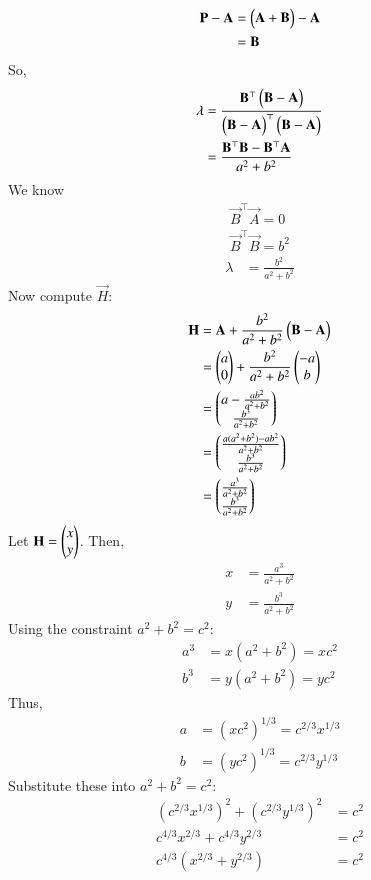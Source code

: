 \documentclass[journal]{IEEEtran}
\begin{document}
\begin{align}
\mathbf{P}-\mathbf{A} &= \begin{pmatrix}\mathbf{A}+\mathbf{B}\end{pmatrix}-\mathbf{A} \\
&= \mathbf{B}
\end{align}
So,
\begin{align}
\lambda &= \frac{\mathbf{B}^\top\begin{pmatrix}\mathbf{B}-\mathbf{A}\end{pmatrix}}{\begin{pmatrix}\mathbf{B}-\mathbf{A}\end{pmatrix}^\top\begin{pmatrix}\mathbf{B}-\mathbf{A}\end{pmatrix}} \\
&= \frac{\mathbf{B}^\top\mathbf{B}-\mathbf{B}^\top\mathbf{A}}{a^2+b^2}
\end{align}
We know
\begin{align}
\vec{B}^\top\vec{A}=0\\
\vec{B}^\top\vec{B}=b^2
\end{align}
\begin{align}
\lambda &= \frac{b^2}{a^2+b^2}
\end{align}
Now compute $\vec{H}$:
\begin{align}
\mathbf{H} &= \mathbf{A} + \frac{b^2}{a^2+b^2}\begin{pmatrix}\mathbf{B}-\mathbf{A}\end{pmatrix}\\
&= \begin{pmatrix}a\\0\end{pmatrix} + \frac{b^2}{a^2+b^2}\begin{pmatrix}-a\\b\end{pmatrix} \\
&= \begin{pmatrix}a - \frac{ab^2}{a^2+b^2} \\ \frac{b^3}{a^2+b^2}\end{pmatrix} \\
&= \begin{pmatrix}\frac{a(a^2+b^2)-ab^2}{a^2+b^2} \\ \frac{b^3}{a^2+b^2}\end{pmatrix} \\
&= \begin{pmatrix}\frac{a^3}{a^2+b^2} \\ \frac{b^3}{a^2+b^2}\end{pmatrix}
\end{align}
Let $\mathbf{H} = \begin{pmatrix}x \\ y\end{pmatrix}$. Then,
\begin{align}
x &= \frac{a^3}{a^2+b^2} \\
y &= \frac{b^3}{a^2+b^2}
\end{align}
Using the constraint $a^2+b^2=c^2$:
\begin{align}
a^3 &= x(a^2+b^2) = xc^2 \\
b^3 &= y(a^2+b^2) = yc^2
\end{align}
Thus,
\begin{align}
a &= (xc^2)^{1/3} = c^{2/3}x^{1/3} \\
b &= (yc^2)^{1/3} = c^{2/3}y^{1/3}
\end{align}
Substitute these into $a^2+b^2=c^2$:
\begin{align}
(c^{2/3}x^{1/3})^2 + (c^{2/3}y^{1/3})^2 &= c^2 \\
c^{4/3}x^{2/3} + c^{4/3}y^{2/3} &= c^2 \\
c^{4/3}(x^{2/3} + y^{2/3}) &= c^2
\end{align}
\end{document}
